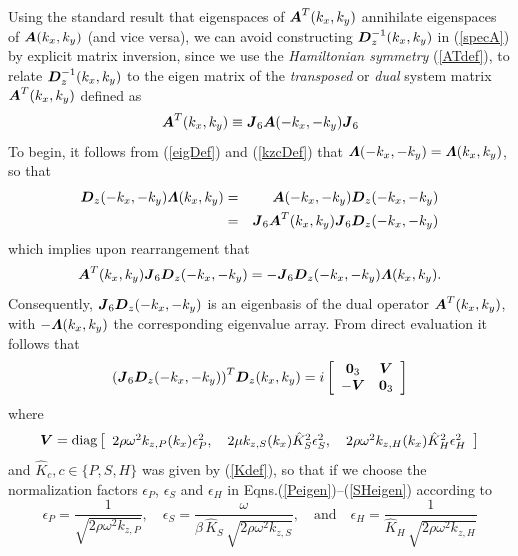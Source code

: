 \documentclass[11pt]{article}
\newcommand{\bmi}[1]{\mbox{\boldmath$\mit #1$\unboldmath}}
\begin{document}
Using the standard result that eigenspaces of ${\bmi  A}^{T}({k}_{x},{k}_{y})$ annihilate
eigenspaces of ${\bmi  A}({k}_{x},{k}_{y})$ (and vice versa), we can avoid constructing  ${\bmi  D}_{z}^{-1}({k}_{x},{k}_{y})$ in (\ref{specA}) by explicit
matrix inversion, since we use the {\em Hamiltonian symmetry\/}
(\ref{ATdef}), to relate ${\bmi  D}_{z}^{-1}({k}_{x},{k}_{y})$ to the eigen matrix of the
{\em transposed\/} or {\em
dual\/} system matrix ${\bmi  A}^{T}({k}_{x},{k}_{y})$ defined as
\[
{\bmi  A}^{T}({k}_{x},{k}_{y})\equiv {\bmi  J}_6 {\bmi  A}(-{k}_{x},-{k}_{y}) {\bmi  J}_6
\]
To begin, it follows from (\ref{eigDef}) and (\ref{kzcDef}) that ${\bmi
\Lambda}(-{k}_{x},-{k}_{y})={\bmi \Lambda} ({k}_{x},{k}_{y})$,
so that
\begin{eqnarray*}
{\bmi  D}_{z}(-{k}_{x},-{k}_{y}){\bmi \Lambda} ({k}_{x},{k}_{y})&=&
{\bmi  A}(-{k}_{x},-{k}_{y}){\bmi  D}_{z}(-{k}_{x},-{k}_{y})\\
&=&{\bmi  J}_{6}{\bmi
A}^{T}({k}_{x},{k}_{y}){\bmi  J}_{6}{\bmi  D}_{z}(-{k}_{x},-{k}_{y})
\end{eqnarray*}
which implies upon rearrangement that
\[
{\bmi  A}^{T}({k}_{x},{k}_{y}){\bmi  J}_{6}{\bmi  D}_{z}(-{k}_{x},-{k}_{y})=-{\bmi  J}_{6}
{\bmi  D}_{z}(-{k}_{x},-{k}_{y}){\bmi
\Lambda} ({k}_{x},{k}_{y}).
\]
Consequently, ${\bmi  J}_{6}{\bmi  D}_{z}(-{k}_{x},-{k}_{y})$ is an eigenbasis of the dual
operator ${\bmi
A}^{T}({k}_{x},{k}_{y})$, with $-{\bmi  \Lambda} ({k}_{x},{k}_{y})$ the corresponding eigenvalue array.
From direct evaluation it follows that
\begin{equation} \label{dinv1}
{\left({{\bmi  J}_{6}{\bmi  D}_{z}(-{k}_{x},-{k}_{y})}\right)}^{T}{\bmi
D}_{z}({k}_{x},{k}_{y})= i\left[{\begin{array}{cc}{\bf 0}_{3}&{\bmi V}\\
-{\bmi V}&{\bf 0}_{3}\end{array}}\right]
\end{equation}
where
\[
{\bmi V}=
\mbox{diag}\left[\begin{array}{ccc}
2 \rho {\omega }^{  2}{  k}_{  z, P }({k}_{x}){\epsilon
}_{P}^{  2},\,&
2 \mu {  k}_{  z, S }({k}_{x}) \hat{K}_{S }^{2}{\epsilon }_{S}^{
2},\,&
2 \rho {\omega }^{  2}{  k}_{  z, H }({k}_{x}) \hat{K}_{H }^{2}{\epsilon }_{H}^{  2}
\end{array}\right]
\]
and  $\hat{K}_{c}, c\in\{P,S,H\}$ was given by (\ref{Kdef}),
 so that if we choose the normalization factors ${\epsilon }_{P }$,
${\epsilon }_{S}$ and ${\epsilon }_{H}$ in Eqns.(\ref{Peigen})--(\ref{SHeigen})
according to
 \begin{equation} \label{epsdef}
{\epsilon }_{P }= \frac{1}{\sqrt{2 \rho {\omega }^{  2}{  k}_{
z, P }}}, \quad
{\epsilon }_{S }= \frac{\omega}{\beta\,\hat{K}_{S }\,\sqrt{2 \rho {\omega }^{  2}  {  k}_{
z, S }}}
, \quad \mbox{and} \quad
{\epsilon }_{H }= \frac{1}{\hat{K}_{H }\, \sqrt{2 \rho {\omega }^{  2}  {  k}_{
z, H }}}
\end{equation}
\end{document}
